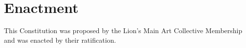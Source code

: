 \chapter{Enactment}\label{sec:enactment}
This Constitution was proposed by the Lion's Main Art Collective Membership and was enacted \dateapproved by their ratification.
